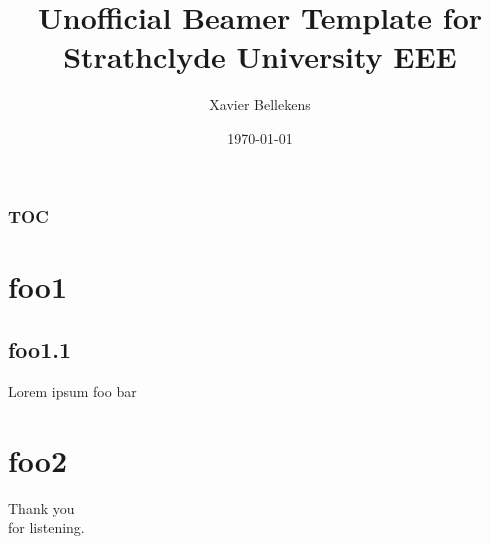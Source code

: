\documentclass{beamer}
\author{Xavier Bellekens}
\title{Unofficial Beamer Template for Strathclyde University EEE}
\date{\today}
\begin{document}
\begin{frame}

\titlepage
\end{frame}

\begin{frame}
	\frametitle{TOC}
	\tableofcontents
\end{frame}

\section{foo1}
\subsection{foo1.1}
\begin{frame}{Lorem ipsum}
foo bar
\end{frame}



\section{foo2}
\begin{frame}
\vfill
\begin{center}\begin{Huge}Thank you \\[10pt]
for listening.\end{Huge}\vfill
\end{center}
\vfill
\end{frame}
\end{document}
